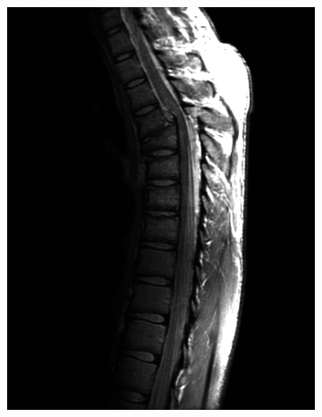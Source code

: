 \begin{figure}[h!]
	\centering
	\begin{subfigure}[b]{0.45\linewidth}
		\includegraphics[width=\linewidth]{myfigure/p1/Fig1.jpg}
		\caption{}
		\label{fig:Fig1}
	\end{subfigure}
  	\begin{subfigure}[b]{0.45\linewidth}

\end{subfigure}
\end{figure}
